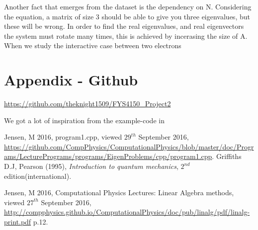 \documentclass[11pt,a4paper,notitlepage]{article}
\begin{document}
Another fact that emerges from the dataset is the dependency on N. Considering the equation, a matrix of size 3 should be able to give you three eigenvalues, but these will be wrong. In order to find the real eigenvalues, and real eigenvectors the system must rotate many times, this is achieved by incerasing the size of A.
When we study the interactive case between two electrons 

\section{Appendix - Github} \label{section:github}
\url{https://github.com/theknight1509/FYS4150_Project2}


We got a lot of inspiration from the example-code in \cite[web-site]{example_code}

\begin{thebibliography}{9}
  Jensen, M 2016,
  program1.cpp,
  viewed $29^{th}$ September 2016,
  \url{https://github.com/CompPhysics/ComputationalPhysics/blob/master/doc/Programs/LecturePrograms/programs/EigenProblems/cpp/program1.cpp}.
  Griffiths D.J, 
  Pearson (1995),
  \emph{Introduction to quantum mechanics},
  $2^{nd}$ edition(international).
  
	Jensen, M 2016, 
	Computational Physics Lectures: Linear
Algebra methods, 
	viewed $27^{th}$ September 2016, 
	\url{http://compphysics.github.io/ComputationalPhysics/doc/pub/linalg/pdf/linalg-print.pdf} p.12. 

\end{thebibliography}
\end{document}
